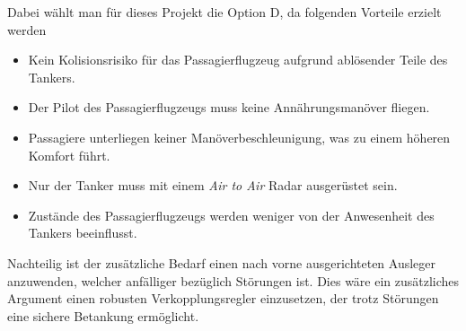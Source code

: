 Dabei wählt man für dieses Projekt die Option D, da folgenden Vorteile erzielt werden \cite{RefuelingTime}
\begin{itemize}
    \item Kein Kolisionsrisiko für das Passagierflugzeug aufgrund ablösender Teile des Tankers.
    \item Der Pilot des Passagierflugzeugs muss keine Annährungsmanöver fliegen.
    \item Passagiere unterliegen keiner Manöverbeschleunigung, was zu einem höheren Komfort führt.
    \item Nur der Tanker muss mit einem \textit{Air to Air} Radar ausgerüstet sein.
    \item Zustände des Passagierflugzeugs werden weniger von der Anwesenheit des Tankers beeinflusst.
\end{itemize}
Nachteilig ist der zusätzliche Bedarf einen nach vorne ausgerichteten Ausleger anzuwenden, welcher anfälliger bezüglich Störungen ist. Dies wäre ein zusätzliches Argument einen robusten Verkopplungsregler einzusetzen, der trotz Störungen eine sichere Betankung ermöglicht.
